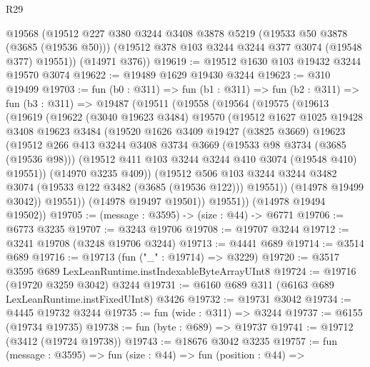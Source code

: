 \begin{lexlean}{R29}
\begin{coremodule}
      @19568
      (@19512
        @227
        @380
        @3244
        @3408
        @3878
        @5219
        (@19533 @50 @3878 (@3685 (@19536 @50)))
        (@19512 @378 @103 @3244 @3244 @377 @3074 (@19548 @377) @19551))
      (@14971 @376))
@19619 := @19512 @1630 @103 @19432 @3244 @19570 @3074
@19622 := @19489 @1629 @19430 @3244
@19623 := @310 @19499
@19703 := fun (b0 : @311) =>
  fun (b1 : @311) =>
  fun (b2 : @311) =>
  fun (b3 : @311) =>
  @19487
    (@19511
      (@19558
        (@19564
          (@19575
            (@19613
              (@19619
                (@19622
                  (@3040 @19623 @3484)
                  @19570
                  (@19512
                    @1627
                    @1025
                    @19428
                    @3408
                    @19623
                    @3484
                    (@19520
                      @1626
                      @3409
                      @19427
                      (@3825 @3669)
                      @19623
                      (@19512
                        @266
                        @413
                        @3244
                        @3408
                        @3734
                        @3669
                        (@19533 @98 @3734 (@3685 (@19536 @98)))
                        (@19512 @411 @103 @3244 @3244 @410 @3074 (@19548 @410) @19551))
                      (@14970 @3235 @409))
                    (@19512
                      @506
                      @103
                      @3244
                      @3244
                      @3482
                      @3074
                      (@19533 @122 @3482 (@3685 (@19536 @122)))
                      @19551))
                  (@14978 @19499 @3042))
                @19551))
            (@14978 @19497 @19501))
          @19551))
      (@14978 @19494 @19502))
@19705 := (message : @3595) -> (size : @44) -> @6771
@19706 := @6773 @3235
@19707 := @3243 @19706
@19708 := @19707 @3244
@19712 := @3241 @19708 (@3248 @19706 @3244)
@19713 := @4441 @689
@19714 := @3514 @689
@19716 := @19713 (fun ("_" : @19714) => @3229)
@19720 := @3517 @3595 @689 LexLeanRuntime.instIndexableByteArrayUInt8
@19724 := @19716 (@19720 @3259 @3042) @3244
@19731 := @6160 @689 @311 (@6163 @689 LexLeanRuntime.instFixedUInt8) @3426
@19732 := @19731 @3042
@19734 := @4445 @19732 @3244
@19735 := fun (wide : @311) => @3244
@19737 := @6155 (@19734 @19735)
@19738 := fun (byte : @689) => @19737
@19741 := @19712 (@3412 (@19724 @19738))
@19743 := @18676 @3042 @3235
@19757 := fun (message : @3595) =>
  fun (size : @44) =>
  fun (position : @44) =>

\end{coremodule}
\end{lexlean}
